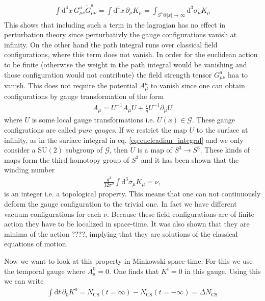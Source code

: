 \documentclass[13pt,a4paper,twoside,titlepage]{article}
\begin{document}
\begin{align}
    \label{eq:eucleadian_integral}
    \int \mathrm{d}^4 x \, G^a_{\mu \nu} \tilde{G}^a_{\mu \nu} = \int \mathrm{d}^4 x \, \partial_\mu K_\mu = \int_{S^3 @ |x| \to \infty} \mathrm{d}^3 \sigma_\mu K_\mu
\end{align}
This shows that including such a term in the lagragian has no effect in perturbation theory since perturbativly the gauge configurations vanish at infinity.
On the other hand the path integral runs over classical field configurations, where this term does not vanish.
In order for the euclidean action to be finite (otherwise the weight in the path integral would be vanishing and those configuration would not contribute) the field strength tensor $G^a_{\mu \nu}$ haa to vanish.
This does not require the potential $A^a_\mu$ to vanish since one can obtain configurations by gauge transformation of the form
\begin{align}
    A_\mu = U^{-1} A_\mu U + \frac{i}{g} U^{-1} \partial_\mu U
\end{align}
where $U$ is some local gauge transformations i.e. $U(x) \in \mathcal{G}$.
These gauge configrations are called \emph{pure gauges}.
If we restrict the map $U$ to the surface at infinity, as in the surface integral in eq. \eqref{eq:eucleadian_integral} and we only consider a $\mathrm{SU}(2)$ subgroup of $\mathcal{G}$,
then $U$ is a map of $S^3 \to S^3$.
These kinds of maps form the third homotopy group of $S^3$ and it has been shown that the winding number
\begin{align}
    \label{eq:winding_number}
    \frac{g^3}{32 \pi^2} \int \mathrm{d}^3 \sigma_\mu K_\mu
    = \nu,
\end{align}
is an integer i.e. a topological property.
This means that one can not continuously deform the gauge configuration to the trivial one. In fact we have different vacuum configurations for each $\nu$.
Because these field configurations are of finite action they have to be localized in space-time.
It was also shown that they are minima of the action ????, implying that they are solutions of the classical equations of motion.

Now we want to look at this property in Minkowski space-time.
For this we use the temporal gauge where $A_a^0 = 0$. One finds that $K^i = 0$ in this gauge.
Using this we can write
\begin{align}
    \int \mathrm{d} t \, \partial_0 K^0 = N_{\mathrm{CS}}(t = \infty) - N_{\mathrm{CS}}(t = -\infty) = \Delta N_{\mathrm{CS}}
\end{align}
\end{document}
